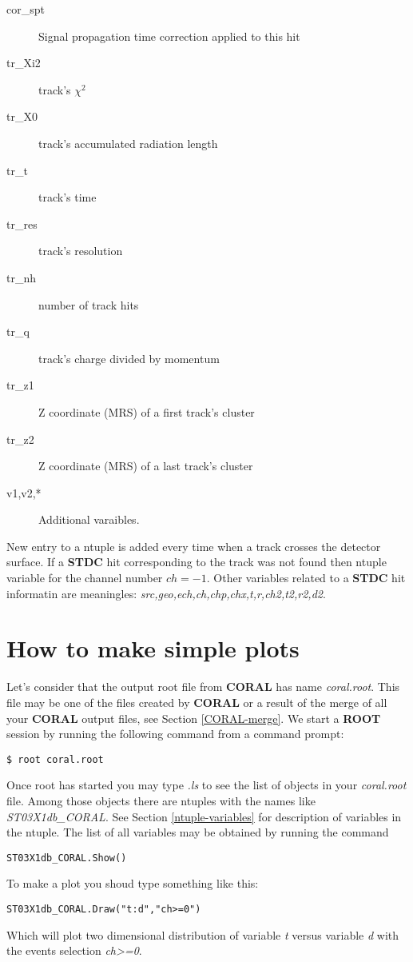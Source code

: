 \documentclass[a4paper,12pt]{article}
\begin{document}
\begin{description}
\item[cor\_spt]  Signal propagation time correction applied to this hit
\item[tr\_Xi2] track's $\chi^2$
\item[tr\_X0]  track's accumulated radiation length
\item[tr\_t]   track's time
\item[tr\_res] track's resolution
\item[tr\_nh]  number of track hits
\item[tr\_q]   track's charge divided by momentum
\item[tr\_z1]  Z coordinate (MRS) of a first track's cluster
\item[tr\_z2]  Z coordinate (MRS) of a last track's cluster
\item[v1,v2,*] Additional varaibles.
\end{description}

New entry to a ntuple is added every time when a track crosses the detector surface.
If a {\bf STDC} hit corresponding to the track was not found then ntuple variable for
the channel number $ch=-1$. Other variables related to a {\bf STDC} hit informatin are
meaningles: {\it src,geo,ech,ch,chp,chx,t,r,ch2,t2,r2,d2}.


\section{How to make simple plots}
Let's consider that the output root file from {\bf CORAL} has name {\it coral.root}.
This file may be one of the files created by {\bf CORAL} or a result of the merge of all
your {\bf CORAL} output files, see Section \ref{CORAL-merge}. We start a {\bf ROOT} session
by running the following command from a command prompt:
\begin{verbatim}
$ root coral.root
\end{verbatim}
Once root has started you may type {\it .ls} to see the list of objects in your
{\it coral.root} file. Among those objects there are ntuples with the names like
{\it ST03X1db\_CORAL}. See Section \ref{ntuple-variables} for description of
variables in the ntuple. The list of all variables may be obtained by running the command
\begin{verbatim}
ST03X1db_CORAL.Show()
\end{verbatim}

To make a plot you shoud type something like this:
\begin{verbatim}
ST03X1db_CORAL.Draw("t:d","ch>=0")
\end{verbatim}
Which will plot two dimensional distribution of variable {\it t} versus variable {\it d}
with the events selection {\it ch>=0}.
\end{document}
